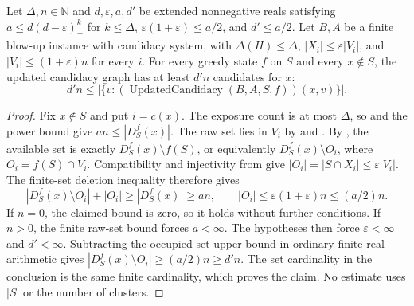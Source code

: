 \begin{lemma}
Let $\Delta,n\in\mathbb N$ and $d,\varepsilon,a,d'$ be extended
nonnegative reals satisfying
$a\leq d(d-\varepsilon)_+^k$ for $k\leq\Delta$,
$\varepsilon(1+\varepsilon)\leq a/2$, and $d'\leq a/2$.
Let $B,A$ be a finite blow-up instance with candidacy system, with
$\Delta(H)\leq\Delta$, $|X_i|\leq\varepsilon|V_i|$, and
$|V_i|\leq(1+\varepsilon)n$ for every $i$.
For every greedy state $f$ on $S$ and every $x\notin S$, the updated
candidacy graph has at least $d'n$ candidates for $x$:
\[
 d'n\leq|\{v:(\operatorname{UpdatedCandidacy}(B,A,S,f))(x,v)\}|.
\]
\end{lemma}
\begin{proof}
Fix $x\notin S$ and put $i=c(x)$. The exposure count is at most
$\Delta$, so  and the power bound
give $an\leq|D_S^f(x)|$. The raw set lies in $V_i$ by
 and . By
, the available set is exactly
$D_S^f(x)\setminus f(S)$, or equivalently
$D_S^f(x)\setminus O_i$, where $O_i=f(S)\cap V_i$.
Compatibility and injectivity from 
give $|O_i|=|S\cap X_i|\leq\varepsilon|V_i|$.
The finite-set deletion inequality therefore gives
\[
 |D_S^f(x)\setminus O_i|+|O_i|\geq|D_S^f(x)|\geq an,
 \qquad |O_i|\leq\varepsilon(1+\varepsilon)n\leq(a/2)n.
\]
If $n=0$, the claimed bound is zero, so it holds without further
conditions. If $n>0$, the finite raw-set bound forces $a<\infty$.
The hypotheses then force $\varepsilon<\infty$ and $d'<\infty$.
Subtracting the occupied-set upper bound in ordinary finite real
arithmetic gives $|D_S^f(x)\setminus O_i|\geq(a/2)n\geq d'n$.
The set cardinality in the conclusion is the same finite cardinality,
which proves the claim. No estimate uses $|S|$ or the number of clusters.
\end{proof}
